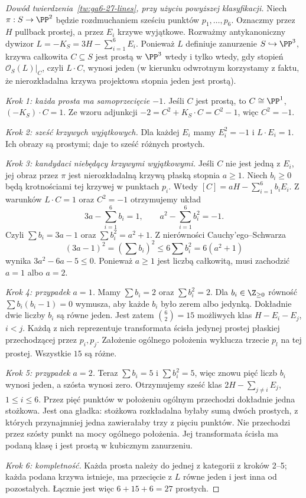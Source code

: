 \begin{proof}[Dowód twierdzenia~\ref{tw:ga6-27-lines}, przy użyciu powyższej klasyfikacji]
Niech $\pi:S\to\PP^2$ będzie rozdmuchaniem
sześciu punktów $p_1,\ldots,p_6$. Oznaczmy
przez $H$ pullback prostej, a przez $E_i$
krzywe wyjątkowe. Rozważmy antykanoniczny
dywizor $L=-K_S=3H-\sum_{i=1}^6E_i$.
Ponieważ $L$ definiuje zanurzenie $S\hookrightarrow\PP^3$,
krzywa całkowita $C\subseteq S$ jest prostą
w $\PP^3$ wtedy i tylko wtedy, gdy stopień
$\mathcal O_S(L)|_C$, czyli $L\cdot C$, wynosi jeden
(w kierunku odwrotnym korzystamy z faktu, że
nierozkładalna krzywa projektowa stopnia jeden
jest prostą).

\emph{Krok 1: każda prosta ma samoprzecięcie $-1$.}
Jeśli $C$ jest prostą, to $C\cong\PP^1$,
$(-K_S)\cdot C=1$. Ze wzoru adjunkcji
$-2=C^2+K_S\cdot C=C^2-1$, więc $C^2=-1$.

\emph{Krok 2: sześć krzywych wyjątkowych.}
Dla każdej $E_i$ mamy $E_i^2=-1$ i
$L\cdot E_i=1$. Ich obrazy są prostymi;
daje to sześć różnych prostych.

\emph{Krok 3: kandydaci niebędący krzywymi wyjątkowymi.}
Jeśli $C$ nie jest jedną z $E_i$, jej obraz przez
$\pi$ jest nierozkładalną krzywą płaską stopnia
$a\ge1$. Niech $b_i\ge0$ będą krotnościami
tej krzywej w punktach $p_i$. Wtedy
$[C]=aH-\sum_{i=1}^6b_iE_i$. Z warunków
$L\cdot C=1$ oraz $C^2=-1$ otrzymujemy układ
\[
 3a-\sum_{i=1}^6b_i=1,\qquad
 a^2-\sum_{i=1}^6b_i^2=-1.
\]
Czyli $\sum b_i=3a-1$ oraz
$\sum b_i^2=a^2+1$. Z nierówności Cauchy'ego--Schwarza
\[
 (3a-1)^2=\left(\sum b_i\right)^2
 \le6\sum b_i^2=6(a^2+1)
\]
wynika $3a^2-6a-5\le0$. Ponieważ $a\ge1$
jest liczbą całkowitą, musi zachodzić $a=1$ albo $a=2$.

\emph{Krok 4: przypadek $a=1$.}
Mamy $\sum b_i=2$ oraz $\sum b_i^2=2$.
Dla $b_i\in\Z_{\ge0}$ równość
$\sum b_i(b_i-1)=0$ wymusza, aby każde
$b_i$ było zerem albo jedynką. Dokładnie dwie
liczby $b_i$ są równe jeden. Jest zatem
$\binom{6}{2}=15$ możliwych klas
$H-E_i-E_j$, $i<j$. Każdą z nich reprezentuje
transformata ścisła jedynej prostej płaskiej
przechodzącej przez $p_i,p_j$. Założenie
ogólnego położenia wyklucza trzecie $p_l$
na tej prostej. Wszystkie $15$ są różne.

\emph{Krok 5: przypadek $a=2$.}
Teraz $\sum b_i=5$ i $\sum b_i^2=5$,
więc znowu pięć liczb $b_i$ wynosi jeden,
a szósta wynosi zero. Otrzymujemy sześć klas
$2H-\sum_{j\ne i}E_j$, $1\le i\le6$.
Przez pięć punktów w położeniu ogólnym przechodzi
dokładnie jedna stożkowa. Jest ona gładka:
stożkowa rozkładalna byłaby sumą dwóch prostych,
z których przynajmniej jedna zawierałaby trzy
z pięciu punktów. Nie przechodzi przez szósty
punkt na mocy ogólnego położenia. Jej transformata
ścisła ma podaną klasę i jest prostą w kubicznym
zanurzeniu.

\emph{Krok 6: kompletność.}
Każda prosta należy do jednej z kategorii z
kroków 2--5; każda podana krzywa istnieje,
ma przecięcie z $L$ równe jeden i jest inna
od pozostałych. Łącznie jest więc
$6+15+6=27$ prostych.
\end{proof}

